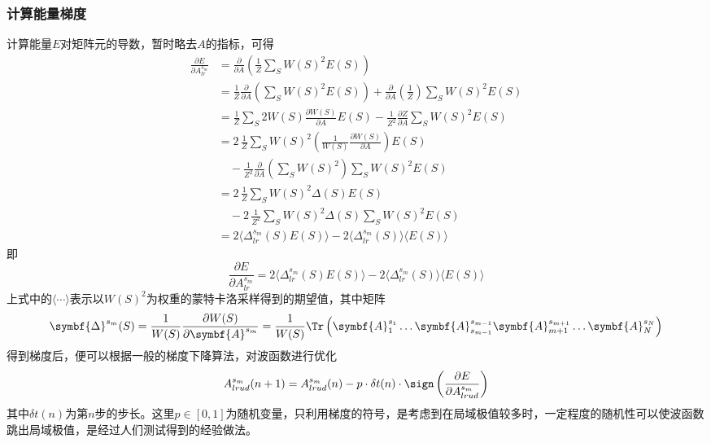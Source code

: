\subsubsection{计算能量梯度}
计算能量$E$对矩阵元的导数\cite[3]{liuGradientOptimizationFinite2017}，暂时略去$A$的指标，可得
\begin{align*}
\frac{\partial E}{\partial A^{s_m}_{lr}} &= \frac{\partial}{\partial A}\left(\frac{1}{Z}\sum_S W\!(S)^2 E(S)\right)\\
		&= \frac{1}{Z} \frac{\partial}{\partial A} \left(\sum_S W\!(S)^2 E(S)\right) + \frac{\partial}{\partial A}\!\left(\frac{1}{Z}\right)\sum_S W\!(S)^2 E(S)\\
		&= \frac{1}{Z} \sum_S 2W\!(S)\frac{\partial W\!(S)}{\partial A} E(S) - \frac{1}{Z^2}\frac{\partial Z}{\partial A} \sum_S W\!(S)^2 E(S)\\
		&= 2\,\frac{1}{Z}\!\sum_S W\!(S)^2\left(\frac{1}{W\!(S)}\frac{\partial W\!(S)}{\partial A}\right) E(S) \\
			&\quad - \frac{1}{Z^2}\frac{\partial}{\partial A}\left(\sum_S W\!(S)^2\right) \sum_S W\!(S)^2 E(S)\\
		&= 2\,\frac{1}{Z}\!\sum_S W\!(S)^2\Delta(S) E(S) \\
		&\quad - 2\,\frac{1}{Z^2}\! \sum_S W\!(S)^2\Delta(S) \sum_S W\!(S)^2 E(S)\\
		&= 2\langle{\Delta}^{s_m}_{lr}(S)E(S)\rangle -  2\langle{\Delta}^{s_m}_{lr}(S)\rangle\langle E(S)\rangle
\end{align*}
即
\begin{equation}\label{eq-gradient}
\frac{\partial E}{\partial A^{s_m}_{lr}} = 2\langle{\Delta}^{s_m}_{lr}(S)E(S)\rangle -  2\langle{\Delta}^{s_m}_{lr}(S)\rangle\langle E(S)\rangle
\end{equation}
上式中的$\langle\cdots\rangle$表示以$W\!(S)^2$为权重的蒙特卡洛采样得到的期望值，其中矩阵
\begin{equation}
\symbf{\Delta}^{s_m}(S)=\frac{1}{W(S)}\frac{\partial W(S)}{\partial \symbf{A}^{s_m}}=\frac{1}{W(S)}\Tr\left(\symbf{A}_1^{s_1}\dots \symbf{A}_{s_{m-1}}^{s_{m-1}}\symbf{A}_{m+1}^{s_{m+1}}\dots \symbf{A}_N^{s_N}\right)
\end{equation}
得到梯度后，便可以根据一般的梯度下降算法，对波函数进行优化
\begin{equation}
A^{s_m}_{lrud}(n+1) = A^{s_m}_{lrud}(n) - p\cdot\delta t(n)\cdot \sign\left(\frac{\partial E}{\partial A^{s_m}_{lrud}}\right)
\end{equation}
其中$\delta t(n)$为第$n$步的步长。这里$p\in [0,1]$为随机变量，只利用梯度的符号，是考虑到在局域极值较多时，一定程度的随机性可以使波函数跳出局域极值，是经过人们测试得到的经验做法。

